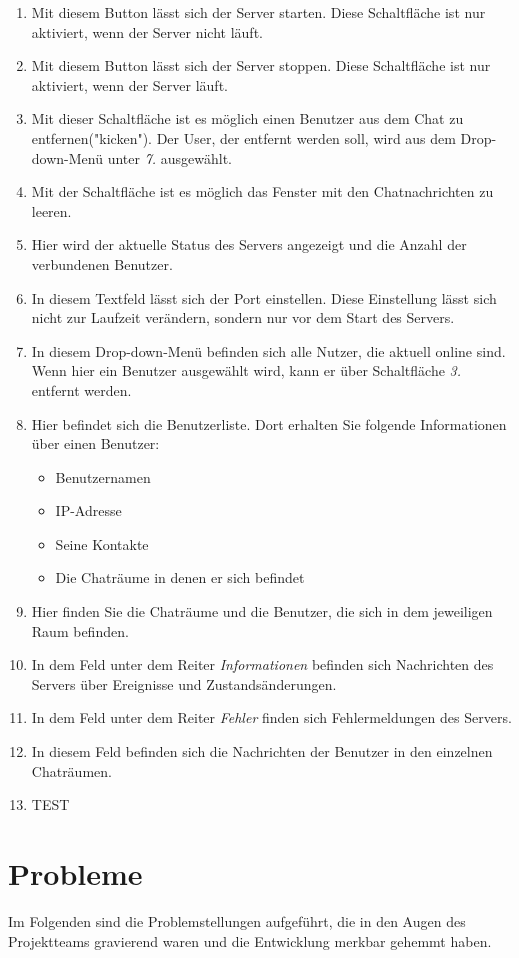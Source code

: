 \documentclass[12pt,a4paper,bibliography=totocnumbered,listof=totocnumbered]{scrartcl}
\begin{document}
\begin{enumerate}
	\item Mit diesem Button lässt sich der Server starten. Diese Schaltfläche ist nur aktiviert, wenn der Server nicht läuft.
	\item Mit diesem Button lässt sich der Server stoppen. Diese Schaltfläche ist nur aktiviert, wenn der Server läuft.
	\item Mit dieser Schaltfläche ist es möglich einen Benutzer aus dem Chat zu entfernen("kicken"). Der User, der entfernt werden soll, wird aus dem Drop-down-Menü unter \textit{7.} ausgewählt.
	\item Mit der Schaltfläche ist es möglich das Fenster mit den Chatnachrichten zu leeren.
	\item Hier wird der aktuelle Status des Servers angezeigt und die Anzahl der verbundenen Benutzer.
	\item In diesem Textfeld lässt sich der Port einstellen. Diese Einstellung lässt sich nicht zur Laufzeit verändern, sondern nur vor dem Start des Servers.
	\item In diesem Drop-down-Menü befinden sich alle Nutzer, die aktuell online sind. Wenn hier ein Benutzer ausgewählt wird, kann er über Schaltfläche \textit{3.} entfernt werden.
	\item Hier befindet sich die Benutzerliste. Dort erhalten Sie folgende Informationen über einen Benutzer:
		\begin{itemize}
			\item Benutzernamen
			\item IP-Adresse
			\item Seine Kontakte
			\item Die Chaträume in denen er sich befindet
		\end{itemize}
	
	\item Hier finden Sie die Chaträume und die Benutzer, die sich in dem jeweiligen Raum befinden.
	\item In dem Feld unter dem Reiter \textit{Informationen} befinden sich Nachrichten des Servers über Ereignisse und Zustandsänderungen.
	\item In dem Feld unter dem Reiter \textit{Fehler} finden sich Fehlermeldungen des Servers.
	\item In diesem Feld befinden sich die Nachrichten der Benutzer in den einzelnen Chaträumen.
	\item TEST
\end{enumerate}
\section{Probleme}
Im Folgenden sind die Problemstellungen aufgeführt, die in den Augen des Projektteams gravierend waren und die Entwicklung merkbar gehemmt haben.
\end{document}
